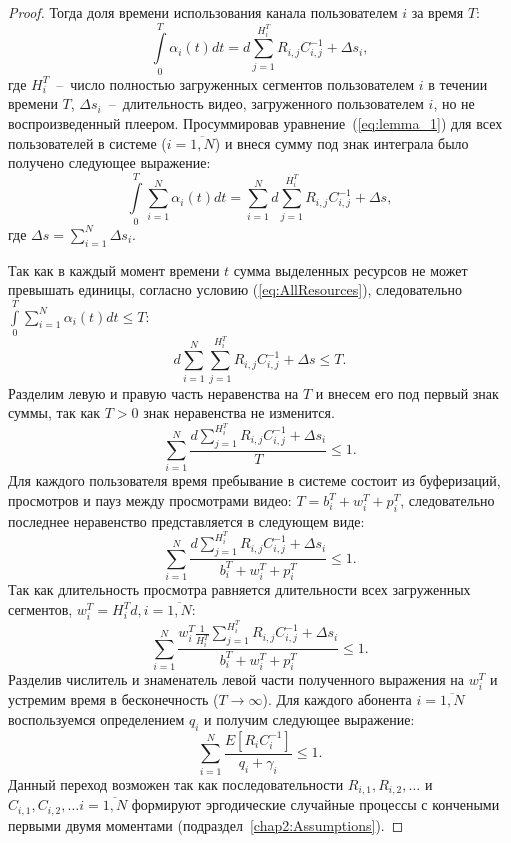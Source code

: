 \begin{proof}
Тогда доля времени использования канала пользователем $i$ за время $T$:
\begin{equation}
	\label{eq:lemma_1}
	\int\limits_{0}^{T}\alpha_i(t) dt = d\sum\limits_{j=1}^{H_i^T}R_{i,j}C_{i,j}^{-1} + \Delta s_i,
\end{equation}
где $H_i^T$~--~число полностью загруженных сегментов пользователем $i$ в течении времени $T$, $\Delta s_i$~--~длительность видео, загруженного пользователем $i$, но не воспроизведенный плеером. Просуммировав уравнение~(\ref{eq:lemma_1}) для всех пользователей в системе ($i=\overline{1,N}$) и внеся сумму под знак интеграла было получено следующее выражение:
\begin{equation}
	\nonumber
	\int\limits_{0}^{T}\sum\limits_{i=1}^{N}\alpha_i(t)dt = \sum\limits_{i=1}^{N}d\sum\limits_{j=1}^{H_i^T}R_{i,j}C_{i,j}^{-1} + \Delta s,
\end{equation}
где $\Delta s = \sum\limits_{i=1}^{N} \Delta s_i$.

Так как в каждый момент времени $t$ сумма выделенных ресурсов не может превышать единицы, согласно условию (\ref{eq:AllResources}), следовательно $\int\limits_{0}^{T}\sum\limits_{i=1}^{N}\alpha_i(t)dt \leq T$:
\begin{equation}
	\nonumber
	d\sum\limits_{i=1}^{N}\sum\limits_{j=1}^{H_i^T}R_{i,j}C_{i,j}^{-1} + \Delta s \leq T.
\end{equation}
Разделим левую и правую часть неравенства на $T$ и внесем его под первый знак суммы, так как $T>0$ знак неравенства не изменится.
\begin{equation}
	\nonumber
	\sum\limits_{i=1}^{N}{\frac{d\sum\limits_{j=1}^{H_i^T}R_{i,j}C_{i,j}^{-1} + \Delta s_i}{T}} \leq 1.
\end{equation}
Для каждого пользователя время пребывание в системе состоит из буферизаций, просмотров и пауз между просмотрами видео: $T = b_i^T + w_i^T + p_i^T $, следовательно последнее неравенство представляется в следующем виде:
\begin{equation}
	\nonumber
	 \sum\limits_{i=1}^{N}{\frac{d\sum\limits_{j=1}^{H_i^T}R_{i,j}C_{i,j}^{-1} + \Delta s_i}{b_i^T + w_i^T + p_i^T}} \leq 1.
\end{equation}
Так как длительность просмотра равняется длительности всех загруженных сегментов, $w_i^T = H_i^T d,i=\overline{1,N}$:
\begin{equation}
	\nonumber
	\sum\limits_{i=1}^{N}\frac{w_i^T \frac{1}{H_i^T}\sum\limits_{j=1}^{H_i^T}R_{i,j}C_{i,j}^{-1} + \Delta s_i}{b_i^T + w_i^T + p_i^T} \leq 1.
\end{equation}
Разделив числитель и знаменатель левой части полученного выражения на $w_i^T$ и устремим время в бесконечность ($T\rightarrow\infty$). Для каждого абонента $i = \overline{1,N}$ воспользуемся определением $q_i$ и получим следующее выражение:
\begin{equation}
	\nonumber
	\sum\limits_{i=1}^{N}\frac{E\left[R_{i}C_{i}^{-1}\right] }{q_i + \gamma_i} \leq 1.
\end{equation}
Данный переход возможен так как последовательности $R_{i,1}, R_{i,2}, \ldots$ и $C_{i,1}, C_{i,2}, \ldots i=\overline{1,N}$ формируют эргодические случайные процессы с кончеными первыми двумя моментами (подраздел~\ref{chap2:Assumptions}).


\end{proof}
